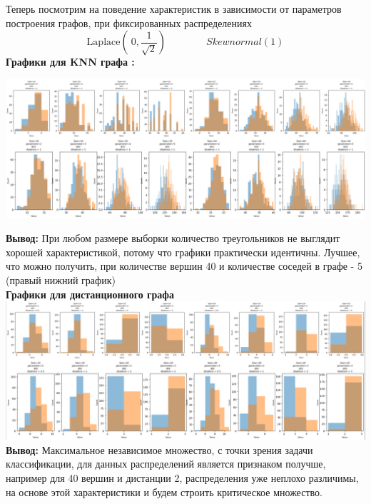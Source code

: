
Теперь посмотрим на поведение характеристик в зависимости от параметров построения графов, при фиксированных распределениях
\\
\begin{equation*}
    \text{Laplace}(\ 0, \frac{1}{\sqrt{2}}) \qquad\qquad Skewnormal (1)
\end{equation*}
\textbf{Графики для KNN графа :}


\hspace*{-1cm}
\includegraphics[width=1\textwidth]{Part-I-Ivanova/2_1_hist.png}

\noindent\textbf{Вывод:} При любом размере выборки количество треугольников не выглядит хорошей характеристикой, потому что графики практически идентичны. Лучшее, что можно получить, при количестве вершин 40 и количестве соседей в графе - 5 (правый нижний график)
\\
\noindent\textbf{Графики для дистанционного графа}
\\
\hspace*{-0.5cm}
\includegraphics[width=1\textwidth]{Part-I-Ivanova/2_2_hist.png}\\ 


\noindent \textbf{Вывод:} Максимальное независимое множество, с точки зрения задачи классификации, для данных распределений является признаком получше, например для 40 вершин и дистанции 2, распределения уже неплохо различимы, на основе этой характеристики и будем строить критическое множество. 
